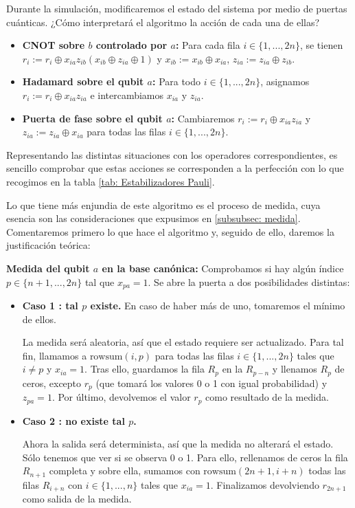 \documentclass[11pt,a4paper,twoside,pdf]{article}
\numberwithin{equation}{section}
\begin{document}
		Durante la simulación, modificaremos el estado del sistema por medio de puertas cuánticas. ¿Cómo interpretará el algoritmo la acción de cada una de ellas?
			
			\begin{itemize}
				\item \textbf{CNOT sobre $b$ controlado por $a$:} Para cada fila $i \in \{1,...,2n\}$, se tienen $r_i := r_i \oplus x_{ia}z_{ib}(x_{ib} \oplus z_{ia} \oplus 1)$ y $x_{ib}:=x_{ib}\oplus x_{ia}$, $z_{ia} := z_{ia} \oplus z_{ib}$.
				
				\item \textbf{Hadamard sobre el qubit $a$:} Para todo $i \in \{1,...,2n\}$, asignamos $r_i := r_i \oplus x_{ia}z_{ia}$ e intercambiamos $x_{ia}$ y $z_{ia}$.
				
				\item \textbf{Puerta de fase sobre el qubit $a$:} Cambiaremos $r_i := r_i \oplus x_{ia}z_{ia}$ y  $z_{ia} := z_{ia} \oplus x_{ia}$ para todas las filas $i\in\{1,...,2n\}$.
			\end{itemize}	
		
		Representando las distintas situaciones con los operadores correspondientes, es sencillo comprobar que estas acciones se corresponden a la perfección con lo que recogimos en la tabla \ref{tab: Estabilizadores Pauli}.
		
		Lo que tiene más enjundia de este algoritmo es el proceso de medida, cuya esencia son las consideraciones que expusimos en \ref{subsubsec: medida}. Comentaremos primero lo que hace el algoritmo y, seguido de ello, daremos la justificación teórica:
		
		\textbf{Medida del qubit $a$ en la base canónica:} Comprobamos si hay algún índice $p \in \{n+1,..., 2n\}$ tal que $x_{pa}=1$. Se abre la puerta a dos posibilidades distintas:
			
			\begin{itemize}
				
				\item[] \textbf{Caso 1 : tal $p$ existe.} En caso de haber más de uno, tomaremos el mínimo de ellos.
					
					La medida será aleatoria, así que el estado requiere ser actualizado. Para tal fin, llamamos a $\text{rowsum}(i,p)$ para todas las filas $i \in \{1,...,2n\}$ tales que $i\ne p$ y $x_{ia}=1$. Tras ello, guardamos la fila $R_{p}$ en la $R_{p-n}$ y llenamos $R_p$ de ceros, excepto $r_p$ (que tomará los valores 0 o 1 con igual probabilidad) y $z_{pa}=1$. Por último, devolvemos el valor $r_p$ como resultado de la medida.
							
				\item[] \textbf{Caso 2 : no existe tal $p$.}
				
					Ahora la salida será determinista, así que la medida no alterará el estado. Sólo tenemos que ver si se observa 0 o 1. Para ello, rellenamos de ceros la fila $R_{n+1}$ completa y sobre ella, sumamos con $\text{rowsum}(2n+1,i+n)$ todas las filas $R_{i+n}$ con $i\in\{1,...,n\}$ tales que $x_{ia}=1$. Finalizamos devolviendo $r_{2n+1}$ como salida de la medida.
				
			\end{itemize}
		
\end{document}
